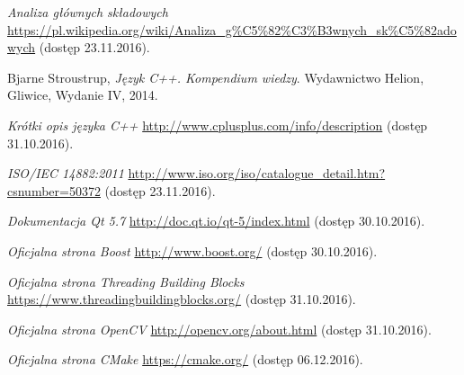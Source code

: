 \documentclass[a4paper,onecolumn,oneside,12pt,extrafontsizes]{memoir}
\begin{document}
\begin{thebibliography}{9}
	
	\emph{Analiza głównych składowych}
  \url{https://pl.wikipedia.org/wiki/Analiza\_g\%C5\%82\%C3\%B3wnych_sk\%C5\%82adowych}
  (dostęp 23.11.2016).
	
	Bjarne Stroustrup,
	\emph{Język C++. Kompendium wiedzy}.
	Wydawnictwo Helion, Gliwice,
	Wydanie IV,
	2014.
	
	\emph{Krótki opis języka C++}
	\url{http://www.cplusplus.com/info/description}
	(dostęp 31.10.2016).

	\emph{ISO/IEC 14882:2011}
	\url{http://www.iso.org/iso/catalogue_detail.htm?csnumber=50372}
	(dostęp 23.11.2016).
	
	\emph{Dokumentacja Qt 5.7}
	\url{http://doc.qt.io/qt-5/index.html}
	(dostęp 30.10.2016).
	
	\emph{Oficjalna strona Boost}
	\url{http://www.boost.org/}
	(dostęp 30.10.2016).
	
	\emph{Oficjalna strona Threading Building Blocks}
	\url{https://www.threadingbuildingblocks.org/}
	(dostęp 31.10.2016).
	
	\emph{Oficjalna strona OpenCV}
	\url{http://opencv.org/about.html}
	(dostęp 31.10.2016).
	
	\emph{Oficjalna strona CMake}
	\url{https://cmake.org/}
	(dostęp 06.12.2016).
	
\end{thebibliography}
\end{document}
